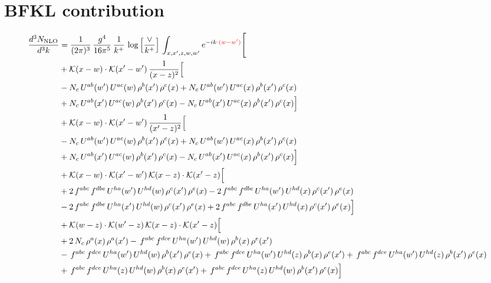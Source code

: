 \documentclass[9pt]{article}
\numberwithin{equation}{section}
\newcommand{\ph}[1]{{\color{red}#1}}
\begin{document}
\section{BFKL contribution}
\begin{align}
\frac{d^{3}N_{\mathrm{NLO}}}{d^{3}k} & = \frac{1}{(2\pi)^{3}}\,\frac{g^{4}}{16\pi^{5}}\,\frac{1}{k^{+}}\,\log\Big[\frac{\vee}{k^{+}}\Big]\,\int_{x,x',z,w,w'}e^{-ik\cdot\ph{(w-w')}}\Bigg[ \notag\\
& +\mathcal{K}(x-w)\cdot\mathcal{K}(x'-w')\,\frac{1}{(x-z)^{2}}\Big[\notag\\
& -N_{c}\,U^{ab}(w')\,U^{ac}(w)\,\rho^{b}(x')\,\rho^{c}(x) +N_{c}\,U^{ab}(w')\,U^{ac}(x)\,\rho^{b}(x')\,\rho^{c}(x)\notag\\
& +N_{c}\,U^{ab}(x')\,U^{ac}(w)\,\rho^{b}(x')\,\rho^{c}(x) -N_{c}\,U^{ab}(x')\,U^{ac}(x)\,\rho^{b}(x')\,\rho^{c}(x)\Big]\notag\\
& +\mathcal{K}(x-w)\cdot\mathcal{K}(x'-w')\,\frac{1}{(x'-z)^{2}}\Big[\notag\\
& -N_{c}\,U^{ab}(w')\,U^{ac}(w)\,\rho^{b}(x')\,\rho^{c}(x) +N_{c}\,U^{ab}(w')\,U^{ac}(x)\,\rho^{b}(x')\,\rho^{c}(x)\notag\\
& +N_{c}\,U^{ab}(x')\,U^{ac}(w)\,\rho^{b}(x')\,\rho^{c}(x) -N_{c}\,U^{ab}(x')\,U^{ac}(x)\,\rho^{b}(x')\,\rho^{c}(x)\Big]\notag\\
& +\mathcal{K}(x-w)\cdot\mathcal{K}(x'-w')\,\mathcal{K}(x-z)\cdot\mathcal{K}(x'-z)\Big[\notag\\
& +2\,f^{abc}\,f^{dbe}\,U^{ha}(w')\,U^{hd}(w)\,\rho^{c}(x')\,\rho^{e}(x) -2\,f^{abc}\,f^{dbe}\,U^{ha}(w')\,U^{hd}(x)\,\rho^{c}(x')\,\rho^{e}(x)\notag\\
& -2\,f^{abc}\,f^{dbe}\,U^{ha}(x')\,U^{hd}(w)\,\rho^{c}(x')\,\rho^{e}(x) +2\,f^{abc}\,f^{dbe}\,U^{ha}(x')\,U^{hd}(x)\,\rho^{c}(x')\,\rho^{e}(x)\Big]\notag\\
& +\mathcal{K}(w-z)\cdot\mathcal{K}(w'-z)\,\mathcal{K}(x-z)\cdot\mathcal{K}(x'-z)\Big[\notag\\
& +2\,N_{c}\,\rho^{a}(x)\,\rho^{a}(x') -\,f^{abc}\,f^{dce}\,U^{ha}(w')\,U^{hd}(w)\,\rho^{b}(x)\,\rho^{e}(x')\notag\\
& -\,f^{abc}\,f^{dce}\,U^{ha}(w')\,U^{hd}(w)\,\rho^{b}(x')\,\rho^{e}(x) +\,f^{abc}\,f^{dce}\,U^{ha}(w')\,U^{hd}(z)\,\rho^{b}(x)\,\rho^{e}(x') +\,f^{abc}\,f^{dce}\,U^{ha}(w')\,U^{hd}(z)\,\rho^{b}(x')\,\rho^{e}(x)\notag\\
& +\,f^{abc}\,f^{dce}\,U^{ha}(z)\,U^{hd}(w)\,\rho^{b}(x)\,\rho^{e}(x') +\,f^{abc}\,f^{dce}\,U^{ha}(z)\,U^{hd}(w)\,\rho^{b}(x')\,\rho^{e}(x)\Big]\notag\\

\end{align}
\end{document}
